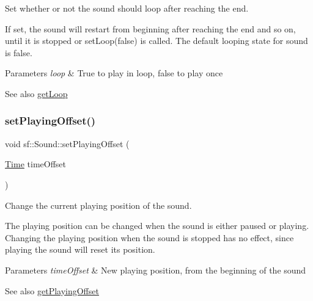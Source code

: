 Set whether or not the sound should loop after reaching the end. 

If set, the sound will restart from beginning after reaching the end and so on, until it is stopped or set\+Loop(false) is called. The default looping state for sound is false.


\begin{DoxyParams}{Parameters}
{\em loop} & True to play in loop, false to play once\\
\hline
\end{DoxyParams}
\begin{DoxySeeAlso}{See also}
\hyperlink{classsf_1_1_sound_a054da07266ce8f39229495146e3041eb}{get\+Loop} 
\end{DoxySeeAlso}
\mbox{\label{classsf_1_1_sound_ab905677846558042022dd6ab15cddff0}} 
\subsubsection{\texorpdfstring{set\+Playing\+Offset()}{setPlayingOffset()}}
{\footnotesize\ttfamily void sf\+::\+Sound\+::set\+Playing\+Offset (\begin{DoxyParamCaption}\item[{\hyperlink{classsf_1_1_time}{Time}}]{time\+Offset }\end{DoxyParamCaption})}



Change the current playing position of the sound. 

The playing position can be changed when the sound is either paused or playing. Changing the playing position when the sound is stopped has no effect, since playing the sound will reset its position.


\begin{DoxyParams}{Parameters}
{\em time\+Offset} & New playing position, from the beginning of the sound\\
\hline
\end{DoxyParams}
\begin{DoxySeeAlso}{See also}
\hyperlink{classsf_1_1_sound_a559bc3aea581107bcb380fdbe523aa08}{get\+Playing\+Offset} 
\end{DoxySeeAlso}
\mbox{\label{classsf_1_1_sound_aa9c91c34f7c6d344d5ee9b997511f754}} 
